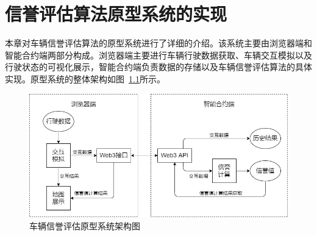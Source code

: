 \chapter{信誉评估算法原型系统的实现}

本章对车辆信誉评估算法的原型系统进行了详细的介绍。该系统主要由浏览器端和智能合约端两部分构成。浏览器端主要进行车辆行驶数据获取、车辆交互模拟以及行驶状态的可视化展示，智能合约端负责数据的存储以及车辆信誉评估算法的具体实现。原型系统的整体架构如图~\ref{fig:proto}所示。

\begin{figure}
  \centering
  \includegraphics[width=0.8\linewidth]{figures/proto.png}
  \caption{车辆信誉评估原型系统架构图}
  \label{fig:proto}
\end{figure}

